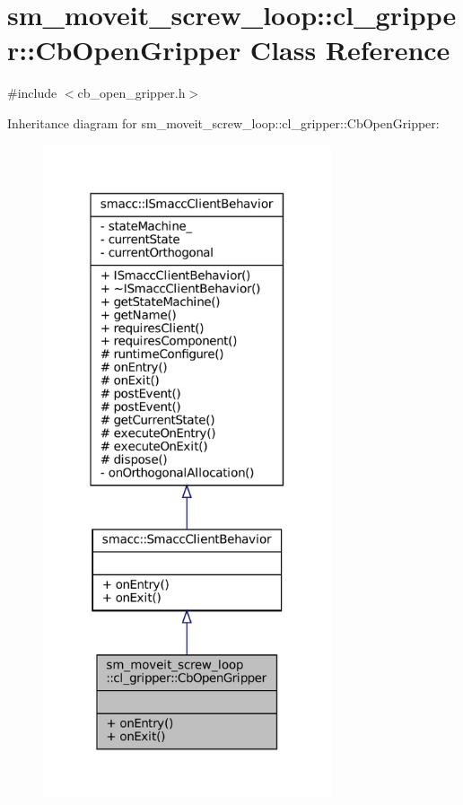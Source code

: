 \hypertarget{classsm__moveit__screw__loop_1_1cl__gripper_1_1CbOpenGripper}{}\section{sm\+\_\+moveit\+\_\+screw\+\_\+loop\+:\+:cl\+\_\+gripper\+:\+:Cb\+Open\+Gripper Class Reference}
\label{classsm__moveit__screw__loop_1_1cl__gripper_1_1CbOpenGripper}


{\ttfamily \#include $<$cb\+\_\+open\+\_\+gripper.\+h$>$}



Inheritance diagram for sm\+\_\+moveit\+\_\+screw\+\_\+loop\+:\+:cl\+\_\+gripper\+:\+:Cb\+Open\+Gripper\+:
\nopagebreak
\begin{figure}[H]
\begin{center}
\leavevmode
\includegraphics[width=241pt]{classsm__moveit__screw__loop_1_1cl__gripper_1_1CbOpenGripper__inherit__graph}
\end{center}
\end{figure}


